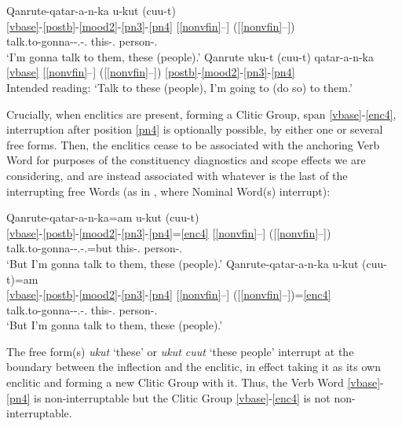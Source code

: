 \documentclass[output=paper]{langscibook}
\begin{document}
\ea\label{ex:key:25}
    \ea\label{ex:key:25a} \glll Qanrute-qatar{}-a-n-ka u-kut (cuu-t)\\
      \ref{vbase}-\ref{postb}-\ref{mood2}-\ref{pn3}-\ref{pn4} [\ref{nonvfin}--] ([\ref{nonvfin}--]) \\
      talk.to-gonna-\Ind{}-\Tpl.\Obj{}-\Fsg.\Aarg{} this-\Abs.\Pl{} person-\Abs.\Pl{}\\
    \glt `I'm gonna talk to them, these (people).'
    \ex\label{ex:key:25b}
    \gll *Qanrute uku-t (cuu-t) qatar-a-n-ka\\
     {}\ref{vbase} [\ref{nonvfin}--] ([\ref{nonvfin}--]) \ref{postb}-\ref{mood2}-\ref{pn3}-\ref{pn4} \\
    \glt Intended reading: `Talk to these (people), I'm going to (do so) to them.'
    \z
\z

Crucially, when enclitics are present, forming a Clitic Group, span \ref{vbase}-\ref{enc4}, interruption after position \ref{pn4} is optionally possible, by either one or several free forms. Then, the enclitics cease to be associated with the anchoring Verb Word for purposes of the constituency diagnostics and scope effects we are considering, and are instead associated with whatever is the last of the interrupting free Words (as in , where Nominal Word(s) interrupt):

\ea\label{ex:key:26}
\ea\label{ex:key:26a}\glll Qanrute-qatar-a-n-ka=am u-kut (cuu-t)\\
    \ref{vbase}-\ref{postb}-\ref{mood2}-\ref{pn3}-\ref{pn4}=\ref{enc4} [\ref{nonvfin}--] ([\ref{nonvfin}--]) \\
     talk.to-gonna-\Ind{}-\Tpl.\Obj{}-\Fsg.\Aarg{}=but this-\Abs.\Pl{} person-\Abs.\Pl{}\\
\glt `But I'm gonna talk to them, these (people).'
\ex\label{ex:key:26b}
\glll Qanrute-qatar-a-n-ka u-kut (cuu-t)=am\\
       \ref{vbase}-\ref{postb}-\ref{mood2}-\ref{pn3}-\ref{pn4} [\ref{nonvfin}--] ([\ref{nonvfin}--])=\ref{enc4} \\
     talk.to-gonna-\Ind{}-\Tpl.\Obj{}-\Fsg.\Aarg{} this-\Abs.\Pl{} person-\Abs.\Pl{}\\
\glt `But I'm gonna talk to them, these (people).'
\z
\z

The free form(s) \textit{ukut} `these' or \textit{ukut cuut} `these people' interrupt at the boundary between the inflection and the enclitic, in effect taking it as its own enclitic and forming a new Clitic Group with it. Thus, the Verb Word \ref{vbase}-\ref{pn4} is non-interruptable but the Clitic Group \ref{vbase}-\ref{enc4} is not non-interruptable.
\end{document}
